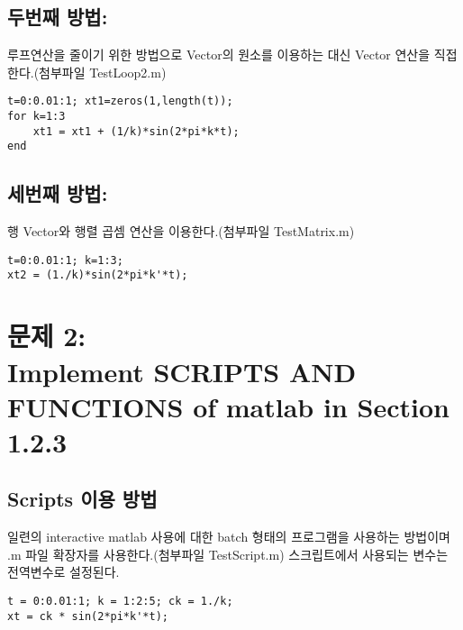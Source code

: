 \documentclass[11pt
  , a4paper
  , article
  , oneside
]{memoir}
\begin{document}
\section{두번째 방법: }
루프연산을 줄이기 위한 방법으로 Vector의 원소를 이용하는 대신 Vector 연산을 직접한다.(첨부파일 TestLoop2.m)

\begin{lstlisting}[style=termstyle]
t=0:0.01:1; xt1=zeros(1,length(t));
for k=1:3
	xt1 = xt1 + (1/k)*sin(2*pi*k*t);
end
\end{lstlisting}


\section{세번째 방법: }
행 Vector와 행렬 곱셈 연산을 이용한다.(첨부파일 TestMatrix.m)

\begin{lstlisting}[style=termstyle]
t=0:0.01:1; k=1:3;
xt2 = (1./k)*sin(2*pi*k'*t);
\end{lstlisting}


\chapter{문제 2: \\Implement SCRIPTS AND FUNCTIONS of matlab in Section 1.2.3}

\section{Scripts 이용 방법}
일련의 interactive matlab 사용에 대한 batch 형태의 프로그램을 사용하는 방법이며 .m 파일 확장자를 사용한다.(첨부파일 TestScript.m)
스크립트에서 사용되는 변수는 전역변수로 설정된다.
\begin{lstlisting}[style=termstyle]
t = 0:0.01:1; k = 1:2:5; ck = 1./k;
xt = ck * sin(2*pi*k'*t);
\end{lstlisting}
\end{document}
